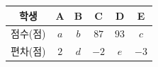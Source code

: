 {\renewcommand{\arraystretch}{1.35}\small
\begin{tabular}{|c|c|c|c|c|c|}
\hline
학생 & A & B & C & D & E \\ \hline
점수(점) & $a$ & $b$ & $87$ & $93$ & $c$ \\ \hline
편차(점) & $2$ & $d$ & $-2$ & $e$ & $-3$ \\ \hline
\end{tabular}}
